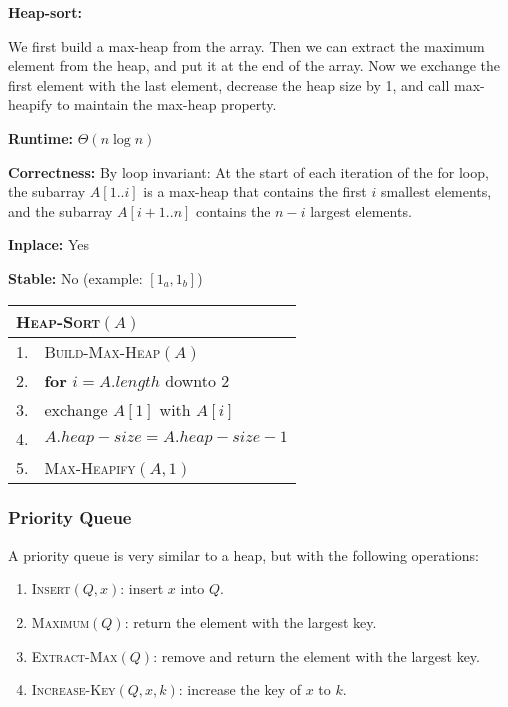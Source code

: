 \documentclass[a4paper,12pt]{article}
\begin{document}
\vspace{1cm}
\textbf{Heap-sort:}

We first build a max-heap from the array.
Then we can extract the maximum element from the heap, and put it at the end of the array.
Now we exchange the first element with the last element, decrease the heap size by 1, and call max-heapify to maintain the max-heap property.

\textbf{Runtime:}
$\Theta(n \log n)$

\textbf{Correctness:}
By loop invariant:
At the start of each iteration of the for loop, the subarray $A[1..i]$ is a max-heap that contains the first $i$ smallest elements, and the subarray $A[i + 1..n]$ contains the $n - i$ largest elements.

\textbf{Inplace:}
Yes

\textbf{Stable:}
No (example: $[1_a, 1_b]$)

\begin{center}
	\begin{tabular}{rl}
		\toprule
		\multicolumn{2}{l}{\textsc{Heap-Sort}$(A)$} \\
		\midrule
		1. & \textsc{Build-Max-Heap}$(A)$ \\
		2. & \textbf{for} $i = A.length$ downto $2$ \\
		3. & \quad exchange $A[1]$ with $A[i]$ \\
		4. & \quad $A.heap-size = A.heap-size - 1$ \\
		5. & \quad \textsc{Max-Heapify}$(A, 1)$ \\
		\bottomrule
	\end{tabular}
\end{center}

\subsubsection{Priority Queue}

A priority queue is very similar to a heap, but with the following operations:
\begin{enumerate}
	\item \textsc{Insert}$(Q, x)$: insert $x$ into $Q$.
	\item \textsc{Maximum}$(Q)$: return the element with the largest key.
	\item \textsc{Extract-Max}$(Q)$: remove and return the element with the largest key.
	\item \textsc{Increase-Key}$(Q, x, k)$: increase the key of $x$ to $k$.
\end{enumerate}
\end{document}
